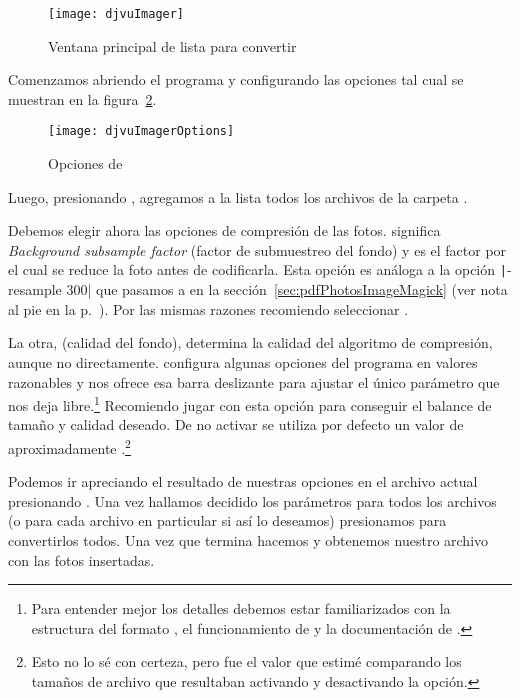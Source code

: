 \documentclass[%
	a5paper,
	10pt,
	twoside,
	openright,
	final,
]{memoir}
\begin{document}
	\begin{figure}
		\texttt{[image: djvuImager]}
		\caption{Ventana principal de \djvuimager lista para convertir\label{fig:djvuImager}}
	\end{figure}

	Comenzamos abriendo el programa y configurando las opciones tal cual se muestran en la figura~\ref{fig:djvuImagerOptions}.

	\begin{figure}
		\texttt{[image: djvuImagerOptions]}
		\caption{Opciones de \djvuimager\label{fig:djvuImagerOptions}}
	\end{figure}

	Luego, presionando , agregamos a la lista todos los archivos de la carpeta .

	Debemos elegir ahora las opciones de compresión de las fotos.  significa \emph{Background subsample factor} (factor de submuestreo del fondo) y es el factor por el cual se reduce la foto antes de codificarla. Esta opción es análoga a la opción \texttt|-resample 300| que pasamos a \imagemagick en la sección~\ref{sec:pdfPhotosImageMagick} (ver nota al pie en la p.~\pageref{foot:resample}). Por las mismas razones recomiendo seleccionar .

	La otra,  (calidad del fondo), determina la calidad del algoritmo de compresión, aunque no directamente. \mondaytwothousand configura algunas opciones del programa  en valores razonables y nos ofrece esa barra deslizante para ajustar el único parámetro que nos deja libre.\footnote{Para entender mejor los detalles debemos estar familiarizados con la estructura del formato \djvu, el funcionamiento de  y la documentación de \djvuimager.} Recomiendo jugar con esta opción para conseguir el balance de tamaño y calidad deseado. De no activar  se utiliza por defecto un valor de aproximadamente .\footnote{Esto no lo sé con certeza, pero fue el valor que estimé comparando los tamaños de archivo que resultaban activando y desactivando la opción.}

	Podemos ir apreciando el resultado de nuestras opciones en el archivo actual presionando . Una vez hallamos decidido los parámetros para todos los archivos (o para cada archivo en particular si así lo deseamos) presionamos  para convertirlos todos. Una vez que termina hacemos  y obtenemos nuestro archivo con las fotos insertadas.
\end{document}

